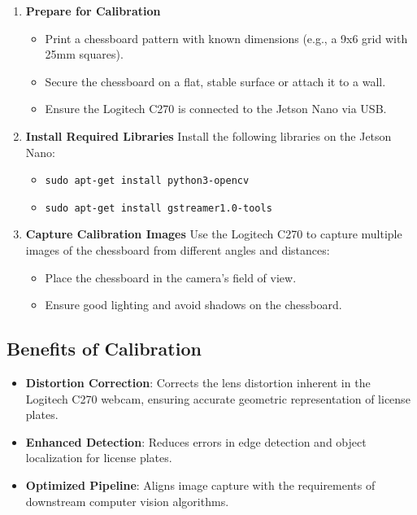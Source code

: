 \begin{enumerate}
	\item \textbf{Prepare for Calibration}
	\begin{itemize}
		\item Print a chessboard pattern with known dimensions (e.g., a 9x6 grid with 25mm squares).
		\item Secure the chessboard on a flat, stable surface or attach it to a wall.
		\item Ensure the Logitech C270 is connected to the Jetson Nano via USB.
	\end{itemize}
	
	\item \textbf{Install Required Libraries}
	Install the following libraries on the Jetson Nano:
	\begin{itemize}
		\item \texttt{sudo apt-get install python3-opencv}
		\item \texttt{sudo apt-get install gstreamer1.0-tools}
	\end{itemize}
	
	\item \textbf{Capture Calibration Images}
	Use the Logitech C270 to capture multiple images of the chessboard from different angles and distances:
	\begin{itemize}
		\item Place the chessboard in the camera's field of view.
		\item Ensure good lighting and avoid shadows on the chessboard.
	\end{itemize}
\end{enumerate}

\subsection{Benefits of Calibration}

\begin{itemize}
	\item \textbf{Distortion Correction}: Corrects the lens distortion inherent in the Logitech C270 webcam, ensuring accurate geometric representation of license plates.
	\item \textbf{Enhanced Detection}: Reduces errors in edge detection and object localization for license plates.
	\item \textbf{Optimized Pipeline}: Aligns image capture with the requirements of downstream computer vision algorithms. \cite{STK:2020}
	
\end{itemize}

